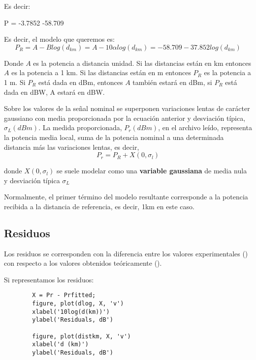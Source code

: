 \documentclass{article}
\begin{document}
    \par Es decir:
    \par \color{blue} \centering P = -3.7852 \hspace{0.1cm }-58.709
    \par \justify \color{black} Es decir, el modelo que queremos es:
    \begin{equation}
        \tag{Modelo}
        P_R = A - Blog(d_{km}) = A - 10\alpha log(d_{km}) = -58.709 -37.852log(d_{km})
    \end{equation}
    \par Donde $ A $ es la potencia a distancia unidad. Si las distancias están en km entonces $ A  $ es la potencia a 1 km. Si las distancias están en m entonces $ P_R$ es la potencia a 1 m. Si $P_R$ está dada en dBm, entonces $A$ también estará en dBm, si $ P_R$ está dada en dBW, A estará en dBW.
    \par Sobre los valores de la señal nominal se superponen variaciones lentas de carácter gaussiano con media proporcionada por la ecuación anterior y desviación típica, $\sigma_L (dBm) $. La medida proporcionada, $P_r (dBm)$, en el archivo leído, representa la potencia media local, suma de la potencia nominal a una determinada distancia más las variaciones lentas, es decir,
    \begin{equation}
        P_r = P_R + X(0,\sigma_l)
        \label{eqn:aleatoriedad}
    \end{equation}
    \par donde $ X(0,\sigma_l) $ se suele modelar como una \textbf{variable gaussiana} de media nula y desviación típica $\sigma_L$
    
    \par Normalmente, el primer término del modelo resultante corresponde a la potencia recibida a la distancia de referencia, es decir, 1km en este caso.
    \clearpage
    \subsection{Residuos}
    \par Los residuos se corresponden con la diferencia entre los valores experimentales () con respecto a los valores obtenidos teóricamente ().
    \par Si representamos los residuos:
    \begin{lstlisting}
        X = Pr - Prfitted;
        figure, plot(dlog, X, 'v')
        xlabel('10log(d(km))')
        ylabel('Residuals, dB')
        
        figure, plot(distkm, X, 'v') 
        xlabel('d (km)')
        ylabel('Residuals, dB')
    \end{lstlisting}
    
\end{document}
